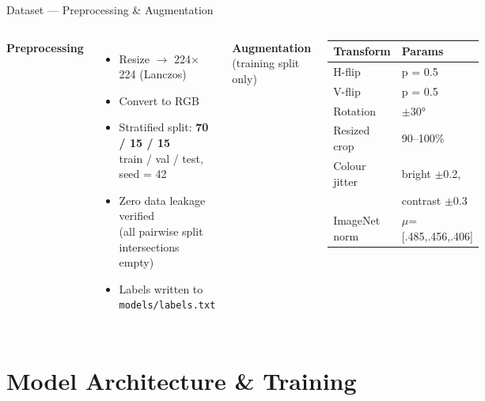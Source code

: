 \documentclass[aspectratio=169]{beamer}
\begin{document}
\begin{frame}{Dataset — Preprocessing \& Augmentation}
  \begin{columns}
      \textbf{Preprocessing}
      \begin{itemize}
        \item Resize $\rightarrow$ 224$\times$224 (Lanczos)
        \item Convert to RGB
        \item Stratified split: \textbf{70 / 15 / 15}\\
              train / val / test, seed = 42
        \item Zero data leakage verified\\
              (all pairwise split intersections empty)
        \item Labels written to \texttt{models/labels.txt}
      \end{itemize}
      \textbf{Augmentation} (training split only)
      \begin{center}
      \begin{tabular}{ll}
        \toprule
        Transform & Params \\
        \midrule
        H-flip        & p = 0.5 \\
        V-flip        & p = 0.5 \\
        Rotation      & $\pm$30° \\
        Resized crop  & 90–100\% \\
        Colour jitter & bright $\pm$0.2, \\
                      & contrast $\pm$0.3 \\
        ImageNet norm & $\mu$=[.485,.456,.406] \\
        \bottomrule
      \end{tabular}
      \end{center}
  \end{columns}
\end{frame}

\section{Model Architecture \& Training}
\end{document}
